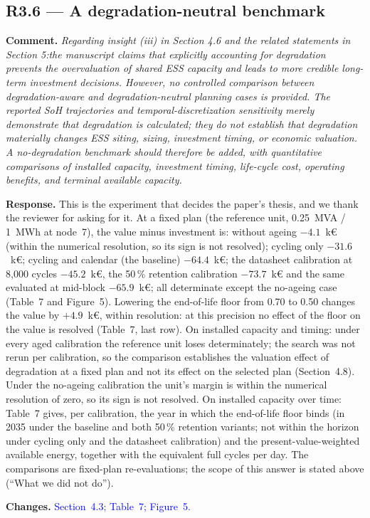 \documentclass[11pt]{article}
\newcommand{\rcomment}[1]{\par\medskip\noindent\textbf{Comment.} \textit{#1}\par\smallskip}
\newcommand{\rresponse}[1]{\noindent\textbf{Response.} #1\par\smallskip}
\newcommand{\rchanges}[1]{\noindent\textbf{Changes.} \textcolor{blue}{#1}\par\medskip}
\begin{document}
\subsection*{R3.6 --- A degradation-neutral benchmark}
\rcomment{
Regarding insight (iii) in Section 4.6 and the related statements in Section 5:the manuscript claims that explicitly accounting for degradation prevents the overvaluation of shared ESS capacity and leads to more credible long-term investment decisions. However, no controlled comparison between degradation-aware and degradation-neutral planning cases is provided. The reported SoH trajectories and temporal-discretization sensitivity merely demonstrate that degradation is calculated; they do not establish that degradation materially changes ESS siting, sizing, investment timing, or economic valuation. A no-degradation benchmark should therefore be added, with quantitative comparisons of installed capacity, investment timing, life-cycle cost, operating benefits, and terminal available capacity.
}
\rresponse{This is the experiment that decides the paper's thesis, and we thank the reviewer for asking for it. At a fixed plan (the reference unit, 0.25~MVA / 1~MWh at node~7), the value minus investment is: without ageing $-4.1$~k\euro{} (within the numerical resolution, so its sign is not resolved); cycling only $-31.6$~k\euro{}; cycling and calendar (the baseline) $-64.4$~k\euro{};  the datasheet calibration at 8,000 cycles $-45.2$~k\euro{}, the 50\,\% retention calibration $-73.7$~k\euro{} and the same evaluated at mid-block $-65.9$~k\euro{}; all determinate except the no-ageing case (Table~7 and Figure~5).
Lowering the end-of-life floor from 0.70 to 0.50 changes the value by $+4.9$~k\euro{}, within resolution: at this precision no effect of the floor on the value is resolved (Table~7, last row). On installed capacity and timing: under every aged calibration the reference unit loses determinately; the search was not rerun per calibration, so the comparison establishes the valuation effect of degradation at a fixed plan and not its effect on the selected plan (Section~4.8). Under the no-ageing calibration the unit's margin is within the numerical resolution of zero, so its sign is not resolved. On installed capacity over time: Table~7 gives, per calibration, the year in which the end-of-life floor binds (in 2035 under the baseline and both 50\,\% retention variants; not within the horizon under cycling only and the datasheet calibration) and the present-value-weighted available energy, together with the equivalent full cycles per day. The comparisons are fixed-plan re-evaluations; the scope of this answer is stated above (``What we did not do'').}
\rchanges{Section~4.3; Table~7; Figure~5.}
\end{document}
